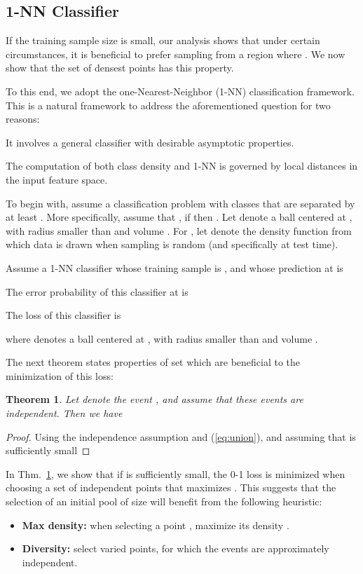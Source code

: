 \documentclass{article}
\newtheorem{theorem}{Theorem}
\begin{document}
\subsection{1-NN Classifier}
\label{app:sec:1_nn_classifier_full_sec}
If the training sample size  is small, our analysis shows that under certain circumstances, it is beneficial to prefer sampling from a region  where . We now show that the set of densest points  has this property.

To this end, we adopt the one-Nearest-Neighbor (1-NN) classification framework. This is a natural framework to address the aforementioned question for two reasons: \begin{inparaenum}[(i)] \item  It involves a general classifier with desirable asymptotic properties.
\item The computation of both class density and 1-NN is governed by local distances in the input feature space.\end{inparaenum} 

To begin with, assume a classification problem with  classes that are separated by at least . More specifically, assume that , if  then  . Let  denote a ball centered at , with radius smaller than  and volume . For , let  denote the density function from which data is drawn when sampling is random (and specifically at test time).

Assume a 1-NN classifier whose training sample is , and whose prediction at  is 


The error probability of this classifier at  is

The  loss of this classifier is

where  denotes a ball centered at , with radius smaller than  and volume . 

The next theorem states properties of set  which are beneficial to the minimization of this loss:

\begin{theorem}
\label{thm:expected_error_1nn}
Let  denote the event , and assume that these events are independent. Then we have

\end{theorem}

\begin{proof}
Using the independence assumption and (\ref{eq:union}), and assuming that   is sufficiently small

\end{proof}

In Thm.~\ref{thm:expected_error_1nn}, we show that if  is sufficiently small, the 0-1 loss is minimized when choosing a set of independent points  that maximizes . This suggests that the selection of an initial pool of size  will benefit from the following heuristic: 
\begin{itemize}[noitemsep]
    \item \textbf{Max density:} when selecting a point , maximize its density .
    \item \textbf{Diversity:} select varied points, for which the events  are approximately independent.
\end{itemize}
\end{document}
